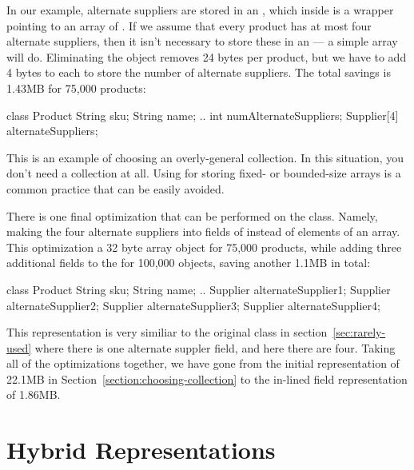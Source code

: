 In our example, alternate suppliers are stored in an
 , which inside is a
wrapper pointing to an array of .  If we assume that
every product has at most four alternate suppliers, then  it isn't 
necessary to store these in an  --- a simple array will do.
Eliminating the  object removes 24 bytes per
product, but we have to add 4 bytes to each  to store the number
of alternate suppliers. The total savings is 1.43MB for 75,000 products:
\begin{shortlisting} 
class Product {
	String sku;
	String name;
	.. 
	int numAlternateSuppliers;
	Supplier[4] alternateSuppliers;
}
\end{shortlisting}
 

This is an example of choosing an overly-general collection. In
this situation, you don't need a collection at all. Using 
for storing fixed- or bounded-size arrays is a
common practice that can be easily avoided.

There is one final optimization that can be performed on the 
class. Namely, making the four alternate suppliers into fields of
 instead of elements of an array. This optimization
 a 32 byte array object for 75,000 products, while adding three additional
 fields to the  for 100,000 objects, saving another 1.1MB in
 total:
\begin{shortlisting}
class Product {
	String sku;
	String name;
	.. 
	Supplier alternateSupplier1;
	Supplier alternateSupplier2;
	Supplier alternateSupplier3;
	Supplier alternateSupplier4;
}
\end{shortlisting}

This representation is very similiar to the original  class in
section~\ref{sec:rarely-used} where there is one alternate suppler field, and
here there are four. Taking all of the optimizations 
together, we have gone from the initial  representation
of 22.1MB in Section~\ref{section:choosing-collection} to the in-lined field
representation of 1.86MB. 

\section{Hybrid Representations}

